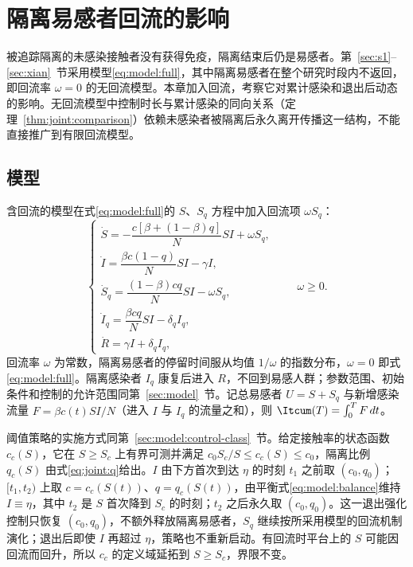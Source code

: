 \section{隔离易感者回流的影响}
\label{sec:return}
被追踪隔离的未感染接触者没有获得免疫，隔离结束后仍是易感者。第~\ref{sec:s1}--\ref{sec:xian}~节采用模型\eqref{eq:model:full}，其中隔离易感者在整个研究时段内不返回，即回流率 $\omega=0$ 的无回流模型。本章加入回流，考察它对累计感染和退出后动态的影响。无回流模型中控制时长与累计感染的同向关系（定理~\ref{thm:joint:comparison}）依赖未感染者被隔离后永久离开传播这一结构，不能直接推广到有限回流模型。

\subsection{模型}
\label{sec:return:model}
含回流的模型在式\eqref{eq:model:full}的 $S$、$S_q$ 方程中加入回流项 $\omega S_q$：
\begin{equation}
\begin{cases}
\dot S=-\dfrac{c[\beta+(1-\beta)q]}{N}SI+\omega S_q,\\[.5em]
\dot I=\dfrac{\beta c(1-q)}{N}SI-\gamma I,\\[.5em]
\dot S_q=\dfrac{(1-\beta)cq}{N}SI-\omega S_q,\\[.5em]
\dot I_q=\dfrac{\beta cq}{N}SI-\delta_q I_q,\\[.5em]
\dot R=\gamma I+\delta_q I_q,
\end{cases}
\qquad\omega\ge0.
\label{eq:return:model}
\end{equation}
回流率 $\omega$ 为常数，隔离易感者的停留时间服从均值 $1/\omega$ 的指数分布，$\omega=0$ 即式\eqref{eq:model:full}。隔离感染者 $I_q$ 康复后进入 $R$，不回到易感人群；参数范围、初始条件和控制的允许范围同第~\ref{sec:model}~节。记总易感者 $U=S+S_q$ 与新增感染流量 $F=\beta c(t)SI/N$（进入 $I$ 与 $I_q$ 的流量之和），则 $\Itcum(T)=\int_0^TF\,dt$。

阈值策略的实施方式同第~\ref{sec:model:control-class}~节。给定接触率的状态函数 $c_c(S)$，它在 $S\ge S_c$ 上有界可测并满足 $c_0S_c/S\le c_c(S)\le c_0$，隔离比例 $q_c(S)$ 由式\eqref{eq:joint:q}给出。$I$ 由下方首次到达 $\eta$ 的时刻 $t_1$ 之前取 $(c_0,q_0)$；$[t_1,t_2)$ 上取 $c=c_c(S(t))$、$q=q_c(S(t))$，由平衡式\eqref{eq:model:balance}维持 $I\equiv\eta$，其中 $t_2$ 是 $S$ 首次降到 $S_c$ 的时刻；$t_2$ 之后永久取 $(c_0,q_0)$。这一退出强化控制只恢复 $(c_0,q_0)$，不额外释放隔离易感者，$S_q$ 继续按所采用模型的回流机制演化；退出后即使 $I$ 再超过 $\eta$，策略也不重新启动。有回流时平台上的 $S$ 可能因回流而回升，所以 $c_c$ 的定义域延拓到 $S\ge S_c$，界限不变。

